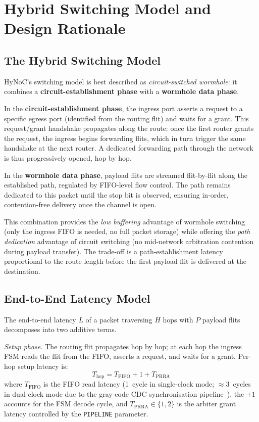 \section{Hybrid Switching Model and Design Rationale}
\label{sec:switching}

\subsection{The Hybrid Switching Model}

HyNoC's switching model is best described as \emph{circuit-switched wormhole}: it
combines a \textbf{circuit-establishment phase} with a \textbf{wormhole data
phase}.

In the \textbf{circuit-establishment phase}, the ingress port asserts a request to
a specific egress port (identified from the routing flit) and waits for a grant.
This request/grant handshake propagates along the route: once the first router
grants the request, the ingress begins forwarding flits, which in turn trigger the
same handshake at the next router. A dedicated forwarding path through the network
is thus progressively opened, hop by hop.

In the \textbf{wormhole data phase}, payload flits are streamed flit-by-flit along
the established path, regulated by FIFO-level flow control. The path remains
dedicated to this packet until the stop bit is observed, ensuring in-order,
contention-free delivery once the channel is open.

This combination provides the \emph{low buffering} advantage of wormhole switching
(only the ingress FIFO is needed, no full packet storage) while offering the
\emph{path dedication} advantage of circuit switching (no mid-network arbitration
contention during payload transfer). The trade-off is a path-establishment latency
proportional to the route length before the first payload flit is delivered at the
destination.

\subsection{End-to-End Latency Model}

The end-to-end latency $L$ of a packet traversing $H$ hops with $P$ payload flits
decomposes into two additive terms.

\emph{Setup phase.} The routing flit propagates hop by hop; at each hop the
ingress FSM reads the flit from the FIFO, asserts a request, and waits for a
grant. Per-hop setup latency is:
\begin{equation}
  T_\text{hop} = T_\text{FIFO} + 1 + T_\text{PRRA}
  \label{eq:thop}
\end{equation}
where $T_\text{FIFO}$ is the FIFO read latency (1~cycle in single-clock mode;
$\approx$3~cycles in dual-clock mode due to the gray-code CDC synchronisation
pipeline~\cite{dally1987}), the $+1$ accounts for the FSM decode cycle, and
$T_\text{PRRA} \in \{1, 2\}$ is the arbiter grant latency controlled by the
\texttt{PIPELINE} parameter.

